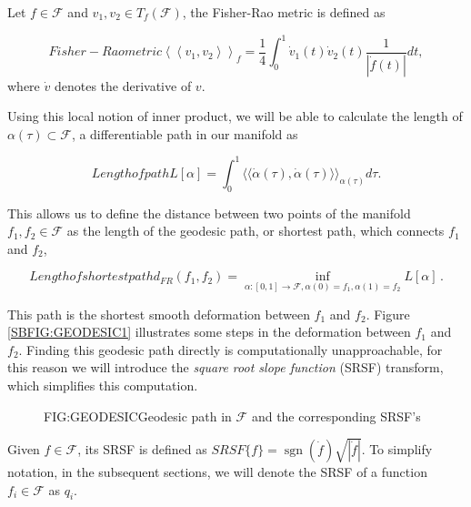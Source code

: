 Let $f \in \mathcal{F}$  and $v_{1}, v_{2} \in T_{f}(\mathcal{F})$,
the Fisher-Rao metric is defined as

\begin{equation}[EQ:FRAO]{Fisher-Rao metric}
\left\langle\left\langle v_{1}, v_{2}\right\rangle\right\rangle_{f}=
\frac{1}{4} \int_{0}^{1} \dot{v}_{1}(t) \dot{v}_{2}(t) \frac{1}{|\dot{f}(t)|}dt,
\end{equation}
where $\dot v$ denotes the derivative of $v$.

Using this local notion of inner product, we will be able to calculate the
length of $\alpha(\tau) \subset \mathcal{F}$, a differentiable path in our
manifold as

\begin{equation}[]{Length of path}
L[\alpha] = \int_0^1 \langle \langle \dot \alpha(\tau), \dot \alpha(\tau)
\rangle \rangle_{\alpha(\tau)} d\tau.
\end{equation}

This allows us to define the distance between two points of the
manifold $f_1, f_2 \in \mathcal{F}$ as the length of the geodesic path, or shortest
path, which connects $f_1$ and $f_2$,

\begin{equation}[]{Length of shortest path}
d_{F R}\left(f_{1}, f_{2}\right)=\inf _{\alpha :[0,1]
\rightarrow \mathcal{F}, \alpha(0)=f_{1}, \alpha(1)=f_{2}} L[\alpha] \, .
\end{equation}

This path is the shortest smooth deformation between $f_1$ and $f_2$. Figure \ref{SBFIG:GEODESIC1} illustrates some steps in the deformation between $f_1$ and $f_2$.
Finding this geodesic path directly is computationally unapproachable,
for this reason we will introduce the \textit{square root slope function} (SRSF)
transform, which simplifies this computation.

\begin{figure}[Geodesic path in $\mathcal{F}$]{FIG:GEODESIC}{Geodesic path in $\mathcal{F}$ and the corresponding SRSF's}
   \quad
\end{figure}

Given $f \in \mathcal{F}$, its SRSF is defined as
$SRSF\{f\} = \operatorname{sgn}{(\dot f)} \sqrt{|\dot f|}$. To simplify notation, in the
subsequent sections, we will denote the SRSF of a function
$f_i \in \mathcal{F}$ as $q_i$.

